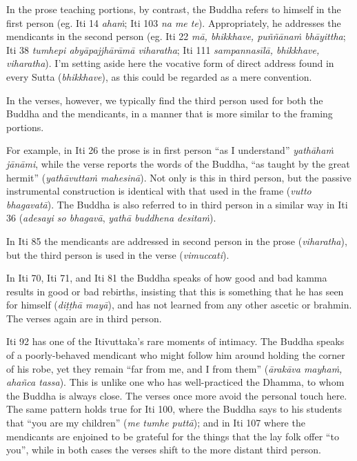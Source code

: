 \documentclass[12pt,openany]{book}%
\begin{document}
In the prose teaching portions, by contrast, the Buddha refers to himself in the first person (eg. Iti 14 \emph{\textsanskrit{ahaṁ}}; Iti 103 \emph{na me te}). Appropriately, he addresses the mendicants in the second person (eg. Iti 22 \emph{\textsanskrit{mā}, bhikkhave, \textsanskrit{puññānaṁ} \textsanskrit{bhāyittha}}; Iti 38 \emph{tumhepi \textsanskrit{abyāpajjhārāmā} viharatha}; Iti 111 \emph{\textsanskrit{sampannasīlā}, bhikkhave, viharatha}). I’m setting aside here the vocative form of direct address found in every Sutta (\emph{bhikkhave}), as this could be regarded as a mere convention.

In the verses, however, we typically find the third person used for both the Buddha and the mendicants, in a manner that is more similar to the framing portions.

For example, in Iti 26 the prose is in first person “as I understand” \emph{\textsanskrit{yathāhaṁ} \textsanskrit{jānāmi}}, while the verse reports the words of the Buddha, “as taught by the great hermit” (\emph{\textsanskrit{yathāvuttaṁ} \textsanskrit{mahesinā}}). Not only is this in third person, but the passive instrumental construction is identical with that used in the frame (\emph{vutto \textsanskrit{bhagavatā}}). The Buddha is also referred to in third person in a similar way in Iti 36 (\emph{adesayi so \textsanskrit{bhagavā}}, \emph{\textsanskrit{yathā} buddhena \textsanskrit{desitaṁ}}).

In Iti 85 the mendicants are addressed in second person in the prose (\emph{viharatha}), but the third person is used in the verse (\emph{vimuccati}).

In Iti 70, Iti 71, and Iti 81 the Buddha speaks of how good and bad kamma results in good or bad rebirths, insisting that this is something that he has seen for himself (\emph{\textsanskrit{diṭṭhā} \textsanskrit{mayā}}), and has not learned from any other ascetic or brahmin. The verses again are in third person.

Iti 92 has one of the Itivuttaka’s rare moments of intimacy. The Buddha speaks of a poorly-behaved mendicant who might follow him around holding the corner of his robe, yet they remain “far from me, and I from them” (\emph{\textsanskrit{ārakāva} \textsanskrit{mayhaṁ}, \textsanskrit{ahañca} tassa}). This is unlike one who has well-practiced the Dhamma, to whom the Buddha is always close. The verses once more avoid the personal touch here. The same pattern holds true for Iti 100, where the Buddha says to his students that “you are my children” (\emph{me tumhe \textsanskrit{puttā}}); and in Iti 107 where the mendicants are enjoined to be grateful for the things that the lay folk offer “to you”, while in both cases the verses shift to the more distant third person.
\end{document}
